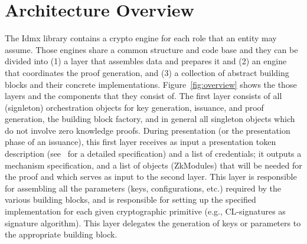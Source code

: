 
\section{Architecture Overview}
\label{sec:arch}

The Idmx library contains a crypto engine for each role that an entity may assume.
Those engines share a common structure and code base and they 
can be divided into (1) a layer that assembles data and prepares it and
(2) an engine that coordinates the proof generation, and (3) a collection of abstract building blocks and 
their concrete implementations.
Figure~\ref{fig:overview} shows the those layers and the components that they consist of.
%
The first layer consists of all (signleton) orchestration objects for key generation, issuance, and 
proof generation,
the building block factory, and in general all singleton objects which do not involve zero knowledge proofs.
%
During presentation (or the presentation phase of an issuance), this first layer
receives as input a presentation token description (see~\cite{abc4trust:h22} for a detailed specification)
and a list of credentials;
it outputs a mechanism specification, and a list of objects (ZkModules) that will be needed for the proof
and which serves as input to the second layer.
This layer is responsible for assembling all the parameters (keys, configurations, etc.) required
by the various building blocks, and is responsible for
setting up the specified implementation for each given cryptographic primitive (e.g., CL-signatures as 
signature algorithm).
%
This layer delegates the generation of keys or parameters to the appropriate building block.


